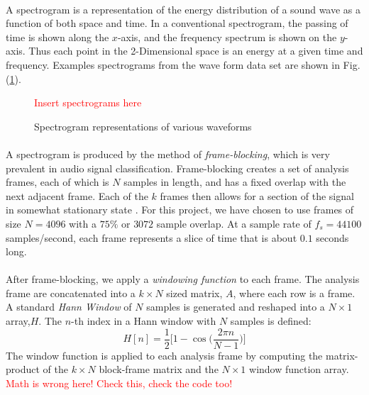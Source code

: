 \documentclass[12pt,letterpaper]{article}
\begin{document}
\paragraph*{}A spectrogram is a representation of the energy distribution of a sound wave as a function of both space and time. In a conventional spectrogram, the passing of time is shown along the $x$-axis, and the frequency spectrum is shown on the $y$-axis. Thus each point in the 2-Dimensional space is an energy at a given time and frequency. Examples spectrograms from the wave form data set are shown in Fig. (\ref{fig-spectrograms}).

\begin{figure}[H]
\begin{center}
\label{fig-spectrograms}
\textcolor{red}{Insert spectrograms here}
\caption{Spectrogram representations of various waveforms}
\end{center}
\end{figure}

\paragraph*{}A spectrogram is produced by the method of \textit{frame-blocking}, which is very prevalent in audio signal classification. Frame-blocking creates a set of analysis frames, each of which is $N$ samples in length, and has a fixed overlap with the next adjacent frame. Each of the $k$ frames then allows for a section of the signal in somewhat stationary state \cite{Liu,Zhan,Kahn,Virtanen}. For this project, we have chosen to use frames of size $N = 4096$ with a $75\%$ or $3072$ sample overlap. At a sample rate of $f_s = 44100$ samples/second, each frame represents a slice of time that is about $0.1$ seconds long. 

\paragraph*{}After frame-blocking, we apply a \textit{windowing function} to each frame. The analysis frame are concatenated into a $k \times N$ sized matrix, $A$, where each row is a frame. A standard \textit{Hann Window} of $N$ samples is generated and reshaped into a $N \times 1$ array,$H$. The $n$-th index in a Hann window with $N$ samples is defined:
\begin{equation}
\label{eqn-Hann}
H[n] = \frac{1}{2}\bigg[ 1 - \cos\Big( \frac{2\pi n}{N-1}\Big)\bigg]
\end{equation}
The window function is applied to each analysis frame by computing the matrix-product of the $k \times N$ block-frame matrix and the $N \times 1$ window function array. \textcolor{red}{Math is wrong here! Check this, check the code too!}
\end{document}
